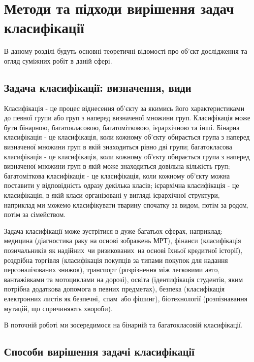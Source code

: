 
\chapter{Методи та підходи вирішення задач класифікації}
\label{chap:review}  %

В даному розділі будуть основні теоретичні відомості про об'єкт дослідження та огляд суміжних робіт в даній сфері.

\section{Задача класифікації: визначення, види}

Класифікація - це процес віднесення об'єкту за якимись його характеристиками до певної групи або груп з наперед визначеної множини груп. Класифікація може бути бінарною, багатокласовою, багатомітковою, ієрархічною та інші. Бінарна класифікація - це класифікація, коли кожному об'єкту обирається група з наперед визначеної множини груп в якій знаходиться рівно дві групи; багатокласова класифікація - це класифікація, коли кожному об'єкту обирається група з наперед визначеної множини груп в якій може знаходиться довільна кількість груп; багатоміткова класифікація - це класифікація, коли кожному об'єкту можна поставити у відповідність одразу декілька класів; ієрархічна класифікація - це класифікація, в якій класи організовані у вигляді ієрархічної структури, наприклад ми можемо класифікувати тварину спочатку за видом, потім за родом, потім за сімейством. 

Задача класифікації може зустрітися в дуже багатьох сферах, наприклад: медицина (діагностика раку на основі зображень МРТ), фінанси (класифікація позичальників як \glqq надійних\grqq\ чи \glqq ризикованих\grqq\ на основі їхньої кредитної історії), роздрібна торгівля (класифікація покупців за типами покупок для надання персоналізованих знижок), транспорт (розрізнення між легковими авто, вантажівками та мотоциклами на дорозі), освіта (ідентифікація студентів, яким потрібна додаткова допомога в певних предметах), безпека (класифікація електронних листів як \glqq безпечні,\grqq\ \glqq спам\grqq\ або \glqq фішинг\grqq), біотехнології (розпізнавання мутацій, що спричиняють хвороби). 

В поточній роботі ми зосередимося на бінарній та багатокласовій класифікації.

\section{Способи вирішення задачі класифікації}

